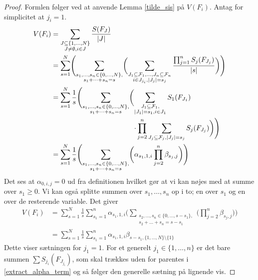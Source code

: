 \documentclass[a4paper, 12pt]{article}
\begin{document}
\begin{proof}
Formlen følger ved at anvende Lemma \ref{tilde_sis} på $ V(F_i)$. Antag for simplicitet at $j_i=1$.
\begin{align}
 V(F_i)&=\sum_{\substack{J\subseteq\{1,\dots, N\}\\ J\neq \emptyset, i\in J}} \frac{ S(F_J)}{|J|}\nonumber\\
&=\sum_{s=1}^{N} \Biggl(\sum_{\substack{s_1, \dots, s_n\in \{0, \dots, N\},\\
s_1+\dots+s_n=s}}\biggl(\sum_{\substack{J_1\subseteq \mathcal F_1, \dots, J_n\subseteq \mathcal F_n\\
i\in J_{j_i}, |J_j|=s_j}} \frac{ \prod_{j=1}^nS_j(F_{J_j})}{|s|}\biggr)\Biggr)\nonumber\\
&=\sum_{s=1}^{N}\frac{1}{s} \Biggl(\sum_{\substack{s_1, \dots, s_n\in \{0, \dots, N\},\\
s_1+\dots+s_n=s}}\biggl(\begin{lgathered}[t]\sum_{\substack{J_1\subseteq \mathcal F_1,\\|J_1|=s_1, i\in J_1}}S_1(F_{J_1})\\
\cdot \prod_{j=2}^n \sum_{\substack{J_j\subseteq \mathcal F_j,|J_j|=s_j}} S_j(F_{J_j})\biggr)\Biggr)\end{lgathered}\label{extract_alpha_term}\\
&=\sum_{s=1}^{N}\frac{1}{s} \Biggl(\sum_{\substack{s_1, \dots, s_n\in \{0, \dots, N\},\\
s_1+\dots+s_n=s}}\biggl(\alpha_{s_1, 1,i} \prod_{j=2}^n \beta_{s_j,j}\biggr)\Biggr)\nonumber
\end{align}
Det ses at $\alpha_{0,i,j}=0$ ud fra definitionen hvilket gør at vi kan nøjes med at summe over $s_1\geq 0$. Vi kan også splitte summen over $s_1, \dots, s_n$ op i to; en over $s_1$ og en over de resterende variable. Det giver
\begin{align*}
V(F_i)&=\sum_{s=1}^{N}\frac{1}{s}\sum_{s_1=1}^n \alpha_{s_1, 1,i}  \Biggl(\sum_{\substack{s_2, \dots, s_n\in \{0,\dots, s-s_1\},\\ s_2+\dots+s_n=s-s_1}}\biggl( \prod_{j=2}^n \beta_{s_j,j}\biggr)\Biggr)\\
&=\sum_{s=1}^{N}\frac{1}{s}\sum_{s_1=1}^n \alpha_{s_1, 1,i} \beta_{s-s_1, \{1, \dots, N\}\setminus \{1\}}
\end{align*}
Dette viser sætningen for $j_1=1$. For et generelt $j_1\in \{1, \dots, n\}$ er det bare summen $\sum S_{j_i}(F_{J_{j_i}})$, som skal trækkes uden for parentes i \eqref{extract_alpha_term} og så følger den generelle sætning på lignende vis. 
\end{proof}
\end{document}
